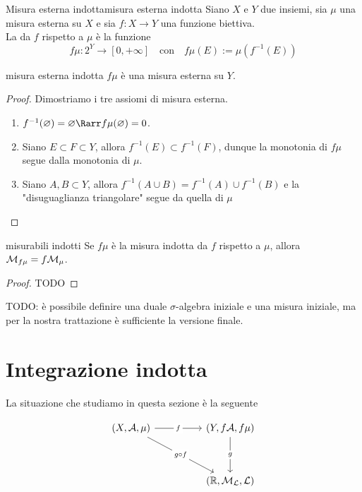 \documentclass{article}
\begin{document}
\begin{definition}{Misura esterna indotta}{misura esterna indotta}
    Siano $X$ e $Y$ due insiemi, sia $\mu$ una misura esterna su $X$ e sia $f:X\to Y$ una funzione biettiva.\\
    La  da $f$ rispetto a $\mu$ è la funzione
    \[f\mu : 2^Y \to [0,+\infty] \quad \text{con} \quad f\mu(E):= \mu(f^{-1}(E)) \]
\end{definition}
\begin{proposition}{}{misura esterna indotta}
    $f\mu$ è una misura esterna su $Y$.
    \begin{proof}
        Dimostriamo i tre assiomi di misura esterna.\begin{enumerate}
            \item $f^{-1}(\varnothing) = \varnothing \Rarr f\mu(\varnothing) = 0$.
            \item Siano $E \subset F \subset Y$, allora $f^{-1}(E)\subset f^{-1}(F)$, dunque la monotonia di $f\mu$ segue dalla monotonia di $\mu$.
            \item Siano $A,B \subset Y$, allora $f^{-1}(A\cup B)= f^{-1}(A) \cup f^{-1}(B) $ e la "disuguaglianza triangolare" segue da quella di $\mu$
        \end{enumerate}
    \end{proof}
\end{proposition}
\begin{proposition}{}{misurabili indotti}
    Se $f\mu$ è la misura indotta da $f$ rispetto a $\mu$, allora $\mathcal{M}_{f\mu} = f \mathcal{M}_\mu$.
    \begin{proof}
        TODO
    \end{proof}
\end{proposition}

TODO: è possibile definire una duale $\sigma$-algebra iniziale e una misura iniziale, ma per la nostra trattazione è sufficiente la versione finale.

\section{Integrazione indotta}

La situazione che studiamo in questa sezione è la seguente

\[\begin{tikzcd}
	{(X,\mc{A},\mu)} && {(Y,f\mc{A},f\mu)} \\
	\\
	&& {(\R,\M_\L,\L)}
	\arrow["f"{description}, from=1-1, to=1-3]
	\arrow["{g \circ f}"{description}, from=1-1, to=3-3]
	\arrow["g"{description}, from=1-3, to=3-3]
\end{tikzcd}\]
\end{document}
